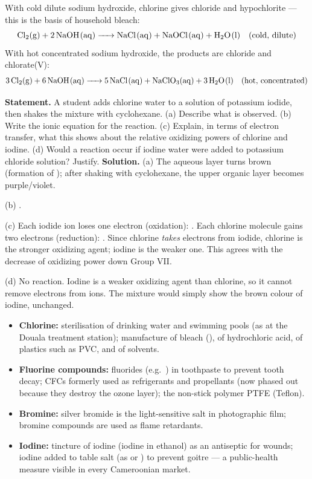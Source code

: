 \documentclass[11pt]{article}
\newcounter{popsec}
\newcounter{popsub}
\newcommand{\courssub}[1]{%
  \stepcounter{popsub}%
  \par\vspace{9pt}\noindent{\popxbold\fontsize{11.5}{13}\selectfont\color{popink}{\color{poporange}\thepopsec.\thepopsub}\hspace{6pt}#1}\par\nopagebreak\vspace{4pt}
}
\begin{document}
With cold dilute sodium hydroxide, chlorine gives chloride and hypochlorite --- this is the basis of household bleach:
\[
\ce{Cl2(g) + 2NaOH(aq) -> NaCl(aq) + NaOCl(aq) + H2O(l)} \quad (\text{cold, dilute})
\]
With hot concentrated sodium hydroxide, the products are chloride and chlorate(V):
\[
\ce{3Cl2(g) + 6NaOH(aq) -> 5NaCl(aq) + NaClO3(aq) + 3H2O(l)} \quad (\text{hot, concentrated})
\]

\begin{exoresolu}
\textbf{Statement.} A student adds chlorine water to a solution of potassium iodide, then shakes the mixture with cyclohexane. (a) Describe what is observed. (b) Write the ionic equation for the reaction. (c) Explain, in terms of electron transfer, what this shows about the relative oxidizing powers of chlorine and iodine. (d) Would a reaction occur if iodine water were added to potassium chloride solution? Justify.
\tcblower
\textbf{Solution.}
(a) The aqueous layer turns brown (formation of ); after shaking with cyclohexane, the upper organic layer becomes purple/violet.

(b) .

(c) Each iodide ion loses one electron (oxidation): . Each chlorine molecule gains two electrons (reduction): . Since chlorine \emph{takes} electrons from iodide, chlorine is the stronger oxidizing agent; iodine is the weaker one. This agrees with the decrease of oxidizing power down Group VII.

(d) No reaction. Iodine is a weaker oxidizing agent than chlorine, so it cannot remove electrons from  ions. The mixture would simply show the brown colour of iodine, unchanged.
\end{exoresolu}

\courssub{Uses of the Halogens}

\begin{itemize}
\item \textbf{Chlorine:} sterilisation of drinking water and swimming pools (as at the Douala treatment station); manufacture of bleach (), of hydrochloric acid, of plastics such as PVC, and of solvents.
\item \textbf{Fluorine compounds:} fluorides (e.g.\ ) in toothpaste to prevent tooth decay; CFCs formerly used as refrigerants and propellants (now phased out because they destroy the ozone layer); the non-stick polymer PTFE (Teflon).
\item \textbf{Bromine:} silver bromide  is the light-sensitive salt in photographic film; bromine compounds are used as flame retardants.
\item \textbf{Iodine:} tincture of iodine (iodine in ethanol) as an antiseptic for wounds; iodine added to table salt (as  or ) to prevent goitre --- a public-health measure visible in every Cameroonian market.
\end{itemize}
\end{document}
